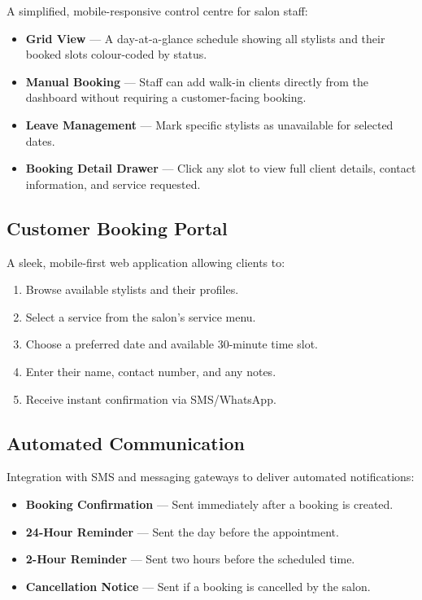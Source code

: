 \documentclass[12pt,a4paper]{report}
\begin{document}
A simplified, mobile-responsive control centre for salon staff:

\begin{itemize}[leftmargin=2em]
  \item \textbf{Grid View} — A day-at-a-glance schedule showing all stylists and
        their booked slots colour-coded by status.
  \item \textbf{Manual Booking} — Staff can add walk-in clients directly from the
        dashboard without requiring a customer-facing booking.
  \item \textbf{Leave Management} — Mark specific stylists as unavailable for
        selected dates.
  \item \textbf{Booking Detail Drawer} — Click any slot to view full client details,
        contact information, and service requested.
\end{itemize}

\subsection{Customer Booking Portal}

A sleek, mobile-first web application allowing clients to:

\begin{enumerate}[leftmargin=2em]
  \item Browse available stylists and their profiles.
  \item Select a service from the salon's service menu.
  \item Choose a preferred date and available 30-minute time slot.
  \item Enter their name, contact number, and any notes.
  \item Receive instant confirmation via SMS/WhatsApp.
\end{enumerate}

\subsection{Automated Communication}

Integration with SMS and messaging gateways to deliver automated notifications:

\begin{itemize}[leftmargin=2em]
  \item \textbf{Booking Confirmation} — Sent immediately after a booking is created.
  \item \textbf{24-Hour Reminder} — Sent the day before the appointment.
  \item \textbf{2-Hour Reminder} — Sent two hours before the scheduled time.
  \item \textbf{Cancellation Notice} — Sent if a booking is cancelled by the salon.
\end{itemize}
\end{document}
